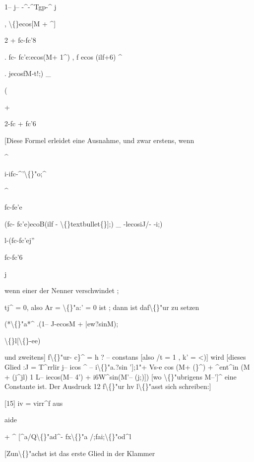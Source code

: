 \documentclass[10pt,a4paper]{article}
\begin{document}
1-- j-- -\textasciicircum{}-\textasciicircum{}Tgp-\textasciicircum{}
j

, \textbackslash\{\}ecos[M + \textasciicircum{}]

2 + fc-fc'8

. fc- fc'e:ecos(M+ 1\textasciicircum{}) , f ecos (ilf+6) \textasciicircum{}

. jecosfM-t!;) \_

(

+

2-fc + fc'6

[Diese Formel erleidet eine Ausnahme,
und zwar erstens, wenn

\textasciicircum{}

i-ifc-\textasciicircum{}'\textbackslash\{\}"o;\textasciicircum{}

\textasciicircum{}

fc-fe'e

(fc- fc'e)ecoB(ilf - \textbackslash\{\}textbullet\{\}];) \_ -lecosiJ/- -i;)

l-(fc-fc'ej''

fc-fc'6

j

wenn einer der Nenner verschwindet ;

tj\textasciicircum{} = 0, also Ar = \textbackslash\{\}"a:' = 0 ist ; dann ist daf\textbackslash\{\}"ur zu setzen

(*\textbackslash\{\}"a*\textasciicircum{} .(1-- J-ecosM + |ew?sinM);

\textbackslash\{\}l[\textbackslash\{\}-ee)

und zweitens] f\textbackslash\{\}"ur- c\}\textasciicircum{} = h ? -- constans [also /t = 1 , k' = <)] wird [dieses Glied :J
= T\textasciicircum{}rrlir j-- icos \textasciicircum{} -- i\textbackslash\{\}"a.?sin '];1"+ Vs-e cos (M+ (\}\textasciicircum{}) + \textasciicircum{}ent\textasciicircum{}in (M + (j\textasciicircum{}jl)
1
L-- iecos(M-- 4') + i6W\textasciicircum{}sin(M'-- (j;)])
[wo \textbackslash\{\}"ubrigens M--']\textasciicircum{} eine Constante ist.
Der Ausdruck 12 f\textbackslash\{\}"ur hv l\textbackslash\{\}"asst sich schreiben:]

[15] iv = virr\textasciicircum{}f
aus

aide

+ \textasciicircum{} [\textasciicircum{}a/Q\textbackslash\{\}"ad\textasciicircum{}- fx\textbackslash\{\}"a /;fai;\textbackslash\{\}"od\textasciicircum{}l

[Zun\textbackslash\{\}"achst ist das erste Glied in der Klammer
\end{document}
